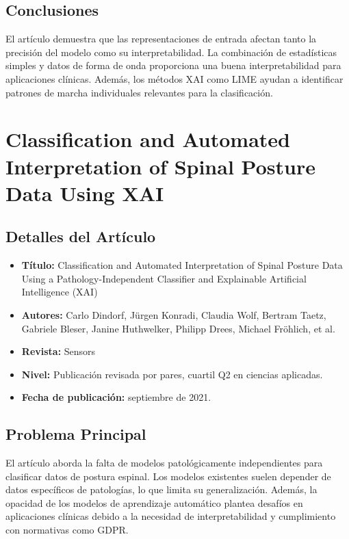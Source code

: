 \documentclass{report}
\begin{document}
\subsection{Conclusiones}
El artículo demuestra que las representaciones de entrada afectan tanto la precisión del modelo como su interpretabilidad. La combinación de estadísticas simples y datos de forma de onda proporciona una buena interpretabilidad para aplicaciones clínicas. Además, los métodos XAI como LIME ayudan a identificar patrones de marcha individuales relevantes para la clasificación.



\section{Classification and Automated Interpretation of Spinal Posture Data Using XAI}

\subsection{Detalles del Artículo}
\begin{itemize}
    \item \textbf{Título:} Classification and Automated Interpretation of Spinal Posture Data Using a Pathology-Independent Classifier and Explainable Artificial Intelligence (XAI)
    \item \textbf{Autores:} Carlo Dindorf, Jürgen Konradi, Claudia Wolf, Bertram Taetz, Gabriele Bleser, Janine Huthwelker, Philipp Drees, Michael Fröhlich, et al.
    \item \textbf{Revista:} Sensors
    \item \textbf{Nivel:} Publicación revisada por pares, cuartil Q2 en ciencias aplicadas.
    \item \textbf{Fecha de publicación:} septiembre de 2021.
\end{itemize}

\subsection{Problema Principal}
El artículo aborda la falta de modelos patológicamente independientes para clasificar datos de postura espinal. Los modelos existentes suelen depender de datos específicos de patologías, lo que limita su generalización. Además, la opacidad de los modelos de aprendizaje automático plantea desafíos en aplicaciones clínicas debido a la necesidad de interpretabilidad y cumplimiento con normativas como GDPR.
\end{document}

